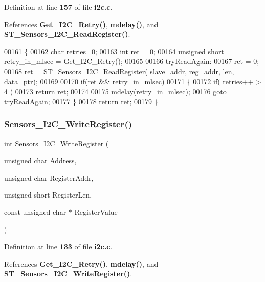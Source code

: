 Definition at line \textbf{ 157} of file \textbf{ i2c.\+c}.



References \textbf{ Get\+\_\+\+I2\+C\+\_\+\+Retry()}, \textbf{ mdelay()}, and \textbf{ S\+T\+\_\+\+Sensors\+\_\+\+I2\+C\+\_\+\+Read\+Register()}.


\begin{DoxyCode}
00161 \{
00162   \textcolor{keywordtype}{char} retries=0;
00163   \textcolor{keywordtype}{int} ret = 0;
00164   \textcolor{keywordtype}{unsigned} \textcolor{keywordtype}{short} retry\_in\_mlsec = Get_I2C_Retry();
00165   
00166 tryReadAgain:  
00167   ret = 0;
00168   ret = ST_Sensors_I2C_ReadRegister( slave\_addr, reg\_addr, len, data\_ptr);
00169 
00170   \textcolor{keywordflow}{if}(ret && retry\_in\_mlsec)
00171   \{
00172     \textcolor{keywordflow}{if}( retries++ > 4 )
00173         \textcolor{keywordflow}{return} ret;
00174     
00175     mdelay(retry\_in\_mlsec);
00176     \textcolor{keywordflow}{goto} tryReadAgain;
00177   \} 
00178   \textcolor{keywordflow}{return} ret;
00179 \}
\end{DoxyCode}
\mbox{\label{i2c_8h_a770c100a15fc6f10e0ce66586db69f8a}} 
\subsubsection{Sensors\+\_\+\+I2\+C\+\_\+\+Write\+Register()}
{\footnotesize\ttfamily int Sensors\+\_\+\+I2\+C\+\_\+\+Write\+Register (\begin{DoxyParamCaption}\item[{unsigned char}]{Address,  }\item[{unsigned char}]{Register\+Addr,  }\item[{unsigned short}]{Register\+Len,  }\item[{const unsigned char $\ast$}]{Register\+Value }\end{DoxyParamCaption})}



Definition at line \textbf{ 133} of file \textbf{ i2c.\+c}.



References \textbf{ Get\+\_\+\+I2\+C\+\_\+\+Retry()}, \textbf{ mdelay()}, and \textbf{ S\+T\+\_\+\+Sensors\+\_\+\+I2\+C\+\_\+\+Write\+Register()}.


